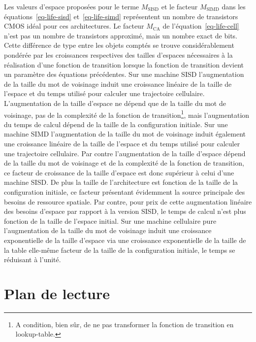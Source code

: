 Les valeurs d'espace propos\'ees pour le terme $M_{\text{SISD}}$ et le
facteur $M_{\text{SIMD}}$ dans les \'equations~\ref{eq-life-sisd}
et~\ref{eq-life-simd} repr\'esentent un nombre de transistors CMOS id\'eal
pour ces architectures. %
Le facteur $M_{\text{CA}}$ de l'\'equation~\ref{eq-life-cell} n'est pas
un nombre de transistors approxim\'e, mais un nombre exact de bits. %
Cette diff\'erence de type entre les objets compt\'es se trouve
consid\'erablement pond\'er\'ee par les croissances respectives des tailles
d'espaces n\'ecessaires \`a la r\'ealisation d'une fonction de transition
lorsque la fonction de transition devient un param\`etre des \'equations
pr\'ec\'edentes. %
Sur une machine SISD l'augmentation de la taille du mot de voisinage
induit une croissance lin\'eaire de la taille de l'espace et du temps
utilis\'e pour calculer une trajectoire cellulaire. %
L'augmentation de la taille d'espace ne d\'epend que de la taille du mot
de voisinage, pas de la complexit\'e de la fonction de
transition\footnote{%
  A condition, bien s\^ur, de ne pas transformer la fonction de
  transition en lookup-table.}, %
mais l'augmentation du temps de calcul d\'epend de la taille de la
configuration initiale. %
Sur une machine SIMD l'augmentation de la taille du mot de voisinage
induit \'egalement une croissance lin\'eaire de la taille de l'espace et
du temps utilis\'e pour calculer une trajectoire cellulaire. %
Par contre l'augmentation de la taille d'espace d\'epend de la taille
du mot de voisinage et de la complexit\'e de la fonction de transition,
ce facteur de croissance de la taille d'espace est donc sup\'erieur \`a
celui d'une machine SISD\@. %
De plus la taille de l'architecture est fonction de la taille de la
configuration initiale, ce facteur pr\'esentant \'evidemment la source
principale des besoins de ressource spatiale. %
Par contre, pour prix de cette augmentation lin\'eaire des besoins
d'espace par rapport \`a la version SISD, le temps de calcul n'est plus
fonction de la taille de l'espace initial. %
Sur une machine cellulaire pure l'augmentation de la taille du mot de
voisinage induit une croissance exponentielle de la taille d'espace
via une croissance exponentielle de la taille de la table elle-m\^eme
facteur de la taille de la configuration initiale, le temps se
r\'eduisant \`a l'unit\'e. %

\section{Plan de lecture}

